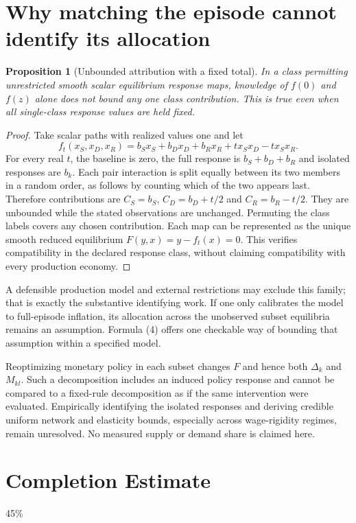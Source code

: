 \documentclass[11pt]{article}
\newtheorem{proposition}[theorem]{Proposition}
\theoremstyle{remark}
\begin{document}
\section{Why matching the episode cannot identify its allocation}
\begin{proposition}[Unbounded attribution with a fixed total]
In a class permitting unrestricted smooth scalar equilibrium response
maps, knowledge of $f(0)$ and $f(z)$ alone does not bound any one class
contribution. This is true even when all single-class response values
are held fixed.
\end{proposition}
\begin{proof}
Take scalar paths with realized values one and let
\[
 f_t(x_S,x_D,x_R)=b_Sx_S+b_Dx_D+b_Rx_R
                  +t x_Sx_D-t x_Sx_R.
\]
For every real $t$, the baseline is zero, the full response is
$b_S+b_D+b_R$ and isolated responses are $b_k$. Each pair interaction
is split equally between its two members in a random order, as follows
by counting which of the two appears last. Therefore contributions are
$C_S=b_S$, $C_D=b_D+t/2$ and $C_R=b_R-t/2$.
They are unbounded while the stated observations are unchanged.
Permuting the class labels covers any chosen contribution.
Each map can be represented as the unique smooth reduced equilibrium
$F(y,x)=y-f_t(x)=0$. This verifies compatibility in the declared response
class, without claiming compatibility with every production economy.
\end{proof}
A defensible production model and external restrictions may exclude this
family; that is exactly the substantive identifying work. If one only
calibrates the model to full-episode inflation, its allocation across the
unobserved subset equilibria remains an assumption. Formula (4) offers
one checkable way of bounding that assumption within a specified model.

Reoptimizing monetary policy in each subset changes $F$ and hence both
$\Delta_k$ and $M_{kl}$. Such a decomposition includes an induced policy
response and cannot be compared to a fixed-rule decomposition as if the
same intervention were evaluated. Empirically identifying the isolated
responses and deriving credible uniform network and elasticity bounds,
especially across wage-rigidity regimes, remain unresolved. No measured
supply or demand share is claimed here.

\section{Completion Estimate}
45\%
\end{document}

